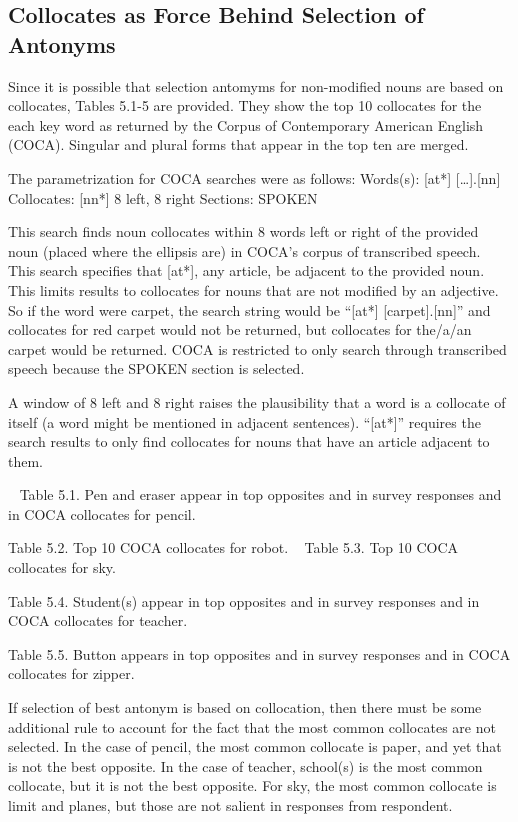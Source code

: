 \subsection {Collocates as Force Behind Selection of Antonyms} Since it is possible that selection antomyms for non-modified nouns are based on collocates, Tables 5.1-5 are provided.  They show the top 10 collocates for the each key word as returned by the Corpus of Contemporary American English (COCA).  Singular and plural forms that appear in the top ten are merged.  

The parametrization for COCA searches were as follows:
Words(s): 	[at*] […].[nn]
Collocates: 	[nn*] 8 left, 8 right
Sections: 	SPOKEN

This search finds noun collocates within 8 words left or right of the provided noun (placed where the ellipsis are) in COCA’s corpus of transcribed speech.  This search specifies that [at*], any article, be adjacent to the provided noun.  This limits results to collocates for nouns that are not modified by an adjective.  So if the word were carpet, the search string would be “[at*] [carpet].[nn]” and collocates for red carpet would not be returned, but collocates for the/a/an carpet would be returned.  COCA is restricted to only search through transcribed speech because the SPOKEN section is selected.

A window of 8 left and 8 right raises the plausibility that a word is a collocate of itself (a word might be mentioned in adjacent sentences).  “[at*]” requires the search results to only find collocates for nouns that have an article adjacent to them.  

 
	Table 5.1. Pen and eraser appear in top opposites and in survey responses and in COCA collocates for pencil.

	Table 5.2. Top 10 COCA collocates for robot.
	 
	Table 5.3. Top 10 COCA collocates for sky.

	Table 5.4. Student(s) appear in top opposites and in survey responses and in COCA collocates for teacher.

	Table 5.5. Button appears in top opposites and in survey responses and in COCA collocates for zipper.

If selection of best antonym is based on collocation, then there must be some additional rule to account for the fact that the most common collocates are not selected.  In the case of pencil, the most common collocate is paper, and yet that is not the best opposite.  In the case of teacher, school(s) is the most common collocate, but it is not the best opposite.  For sky, the most common collocate is limit and planes, but those are not salient in responses from respondent.  

